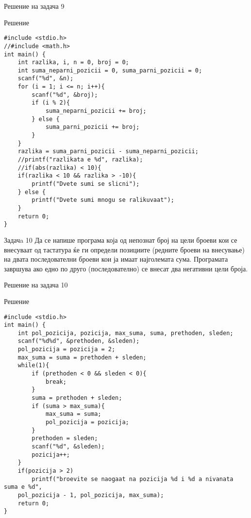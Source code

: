 \begin{frame}[fragile]{Решение на задача 9}
\begin{exampleblock}{Решение}
\begin{lstlisting}
#include <stdio.h> 
//#include <math.h> 
int main() { 
    int razlika, i, n = 0, broj = 0; 
    int suma_neparni_pozicii = 0, suma_parni_pozicii = 0; 
    scanf("%d", &n); 
    for (i = 1; i <= n; i++){ 
        scanf("%d", &broj); 
        if (i % 2){ 
            suma_neparni_pozicii += broj; 
        } else { 
            suma_parni_pozicii += broj; 
        } 
    } 
    razlika = suma_parni_pozicii - suma_neparni_pozicii; 
    //printf("razlikata e %d", razlika); 
    //if(abs(razlika) < 10){ 
    if(razlika < 10 && razlika > -10){ 
        printf("Dvete sumi se slicni"); 
    } else { 
        printf("Dvete sumi mnogu se ralikuvaat"); 
    } 
    return 0; 
}
\end{lstlisting}
\end{exampleblock}
\end{frame}

\begin{frame}{Задачa 10}
Да се напише програма која од непознат број на цели броеви кои се внесуваат од тастатура 
ќе ги определи позициите (редните броеви на внесување) на двата последователни броеви кои 
ја имаат најголемата сума. Програмата завршува ако едно по друго (последователно) 
се внесат два негативни цели броја.
\end{frame}

\begin{frame}[fragile]{Решение на задача 10}
\begin{exampleblock}{Решение}
\begin{lstlisting}
#include <stdio.h> 
int main() { 
    int pol_pozicija, pozicija, max_suma, suma, prethoden, sleden; 
    scanf("%d%d", &prethoden, &sleden); 
    pol_pozicija = pozicija = 2; 
    max_suma = suma = prethoden + sleden; 
    while(1){ 
        if (prethoden < 0 && sleden < 0){ 
            break; 
        } 
        suma = prethoden + sleden; 
        if (suma > max_suma){ 
            max_suma = suma; 
            pol_pozicija = pozicija; 
        } 
        prethoden = sleden; 
        scanf("%d", &sleden); 
        pozicija++; 
    }
    if(pozicija > 2) 
        printf("broevite se naogaat na pozicija %d i %d a nivanata suma e %d",
    pol_pozicija - 1, pol_pozicija, max_suma); 
    return 0; 
}
\end{lstlisting}
\end{exampleblock}
\end{frame}

